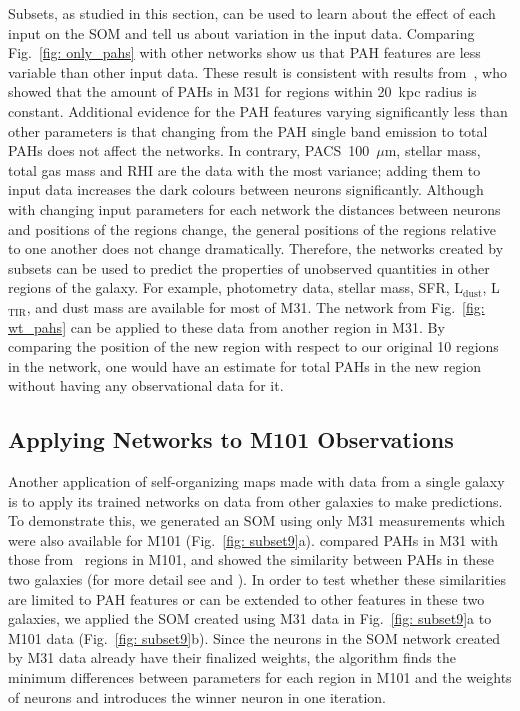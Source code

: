             Subsets, as studied in this section, can be used to learn about the effect of each input on the SOM and tell us about variation in the input data.
            Comparing Fig.~\ref{fig: only_pahs} with other networks show us that PAH features are less variable than other input data.
            These result is consistent with results from~\cite{Draine14}, who showed that the amount of PAHs in M31 for regions within 20~kpc radius is constant.
            Additional evidence for the PAH features varying significantly less than other parameters is that changing from the PAH single band emission to total PAHs does not affect the networks.
            In contrary, PACS~100~$\mu$m, stellar mass, total gas mass and RHI
            are the data with the most variance; adding them to input data increases the dark colours between neurons significantly.
            Although with changing input parameters for each network the distances between neurons and positions of the regions change, the general positions of the regions relative to one another does not change dramatically.
            Therefore, the networks created by subsets can be used to predict the properties of unobserved quantities in other regions of the galaxy.
            For example, photometry data, stellar mass, SFR, L$_\mathrm{dust}$, L$_\mathrm{TIR}$, and dust mass are available for most of M31. 
            The network from Fig.~\ref{fig: wt_pahs} can be applied to 
            these data from another region in M31.
            By comparing the position of the new region with respect to our original 10 regions in the network, one would have an estimate for total PAHs in the new region without having any observational data for it.


    \subsection{Applying Networks to M101 Observations}
    Another application of self-organizing maps made with data from a single galaxy is to apply its trained networks on data from other galaxies to make predictions.
    To demonstrate this, we generated an SOM using only M31 measurements which were also available for M101 (Fig.~\ref{fig: subset9}a). 
    \cite{Dim15} compared PAHs in M31 with those from \hii~regions in M101, and showed the similarity between PAHs in these two galaxies (for more detail see \cite{Dim15} and \cite{Gordon08}).
    In order to test whether these similarities are limited to PAH features or can be extended to other features in these two galaxies, we applied the SOM created using M31 data in Fig.~\ref{fig: subset9}a to M101 data (Fig.~\ref{fig: subset9}b).
    Since the neurons in the SOM network created by M31 data already have their finalized weights, the algorithm finds the minimum differences between parameters for each region in M101 and the weights of neurons and introduces the winner neuron in one iteration.
    

